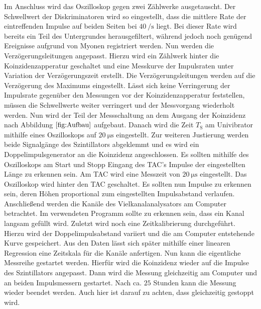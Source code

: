  Im Anschluss wird das Oszilloskop gegen zwei Zählwerke ausgetauscht. Der Schwellwert der Diskriminatoren wird so eingestellt, dass die mittlere Rate der eintreffenden Impulse auf beiden Seiten bei $\SI{40}{\per\second}$ liegt. Bei dieser Rate wird bereits ein Teil des Untergrundes herausgefiltert, während jedoch noch genügend Ereignisse aufgrund von Myonen registriert werden. Nun werden die Verzögerungsleitungen angepasst. Hierzu wird ein Zählwerk hinter die Koinzidenzapperatur geschaltet und eine Messkurve der Impulsraten unter Variation der Verzögerungszeit erstellt. Die Verzögerungsleitungen werden auf die Verzögerung des Maximums eingestellt. Lässt sich keine Verringerung der Impulsrate gegenüber den Messungen vor der Koinzidenzapperatur feststellen, müssen die Schwellwerte weiter verringert und der Messvorgang wiederholt werden. Nun wird der Teil der Messschaltung an dem Ausgang der Koinzidenz nach Abbildung $\ref{fig:Aufbau}$ aufgebaut. Danach wird die Zeit $T_\text{S}$ am Univibrator mithilfe eines Oszilloskops auf $\SI{20}{\micro\second}$ eingestellt. Zur weiteren Justierung werden beide Signalgänge des Szintillators abgeklemmt und es wird ein Doppelimpulsgenerator an die Koinzidenz angeschlossen. Es sollten mithilfe des Oszilloskops am Start und Stopp Eingang des TAC's Impulse der eingestellten Länge zu erkennen sein. Am TAC wird eine Messzeit von $\SI{20}{\micro\second}$ eingestellt. Das Oszilloskop wird hinter den TAC geschaltet. Es sollten nun Impulse zu erkennen sein, deren Höhen proportional zum eingestellten Impulsabstand verlaufen. Anschließend werden die Kanäle des Vielkanalanalysators am Computer betrachtet. Im verwendeten Programm sollte zu erkennen sein, dass ein Kanal langsam gefüllt wird. Zuletzt wird noch eine Zeitkalibrierung durchgeführt. Hierzu wird der Doppelimpulsabstand variiert und die am Computer entstehende Kurve gespeichert. Aus den Daten lässt sich später mithilfe einer linearen Regression eine Zeitskala für die Kanäle anfertigen. Nun kann die eigentliche Messreihe gestartet werden. Hierfür wird die Koinzidenz wieder auf die Impulse des Szintillators angepasst. Dann wird die Messung gleichzeitig am Computer und an beiden Impulsmessern gestartet. Nach ca. $25$ Stunden kann die Messung wieder beendet werden. Auch hier ist darauf zu achten, dass gleichzeitig gestoppt wird.  
